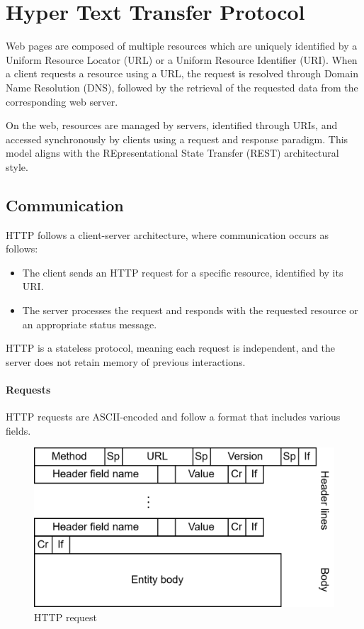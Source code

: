 \section{Hyper Text Transfer Protocol}

Web pages are composed of multiple resources which are uniquely identified by a Uniform Resource Locator (URL) or a Uniform Resource Identifier (URI).
When a client requests a resource using a URL, the request is resolved through Domain Name Resolution (DNS), followed by the retrieval of the requested data from the corresponding web server.

On the web, resources are managed by servers, identified through URIs, and accessed synchronously by clients using a request and response paradigm.
This model aligns with the REpresentational State Transfer (REST) architectural style.

\subsection{Communication}
HTTP follows a client-server architecture, where communication occurs as follows:
\begin{itemize}
    \item The client sends an HTTP request for a specific resource, identified by its URI.
    \item The server processes the request and responds with the requested resource or an appropriate status message.
\end{itemize}
\noindent HTTP is a stateless protocol, meaning each request is independent, and the server does not retain memory of previous interactions. 

\paragraph*{Requests}
HTTP requests are ASCII-encoded and follow a format that includes various fields.
\begin{figure}[H]
    \centering
    \includegraphics[width=0.5\linewidth]{images/io7.png}
    \caption{HTTP request}
\end{figure}

